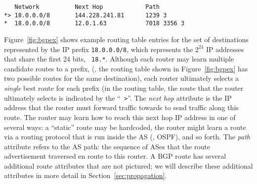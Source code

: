 \begin{figure*}[tb!]
\begin{center}
\begin{small}
\begin{minipage}{5in}
\begin{verbatim}
   Network          Next Hop            Path
*> 18.0.0.0/8       144.228.241.81      1239 3 
*  18.0.0.0/8       12.0.1.63           7018 3356 3 
\end{verbatim}
\end{minipage}
\end{small}
\end{center}
\caption[Example BGP routing table entry]{BGP routing table entry for
prefix 18.0.0.0/8 as 
  it might appear on a router.  Each BGP route has attributes in
  addition to the next hop IP address and AS path, which we will discuss
  later.}
\label{fig:bgpex}
\end{figure*}


Figure~\ref{fig:bgpex} shows example routing table entries for the set
of destinations represented by the IP prefix {\tt 18.0.0.0/8}, which
represents the $2^{24}$ IP addresses that share the first 24 bits, {\tt
18.*}.  Although each router may learn multiple candidate routes
to a prefix, (\ie, the routing table shown in Figure~\ref{fig:bgpex} has
two possible routes for the same destination), each router ultimately
selects a {\em single} best route for each prefix (in the routing table,
the route that the router ultimately selects is indicated by the ``{\tt
>}''.  The {\em next hop} attribute is the IP address that the router
must forward traffic towards to send traffic along this route.  The
router may learn how to reach this next hop IP address in one of several
ways: a ``static'' route may be hardcoded, the router might learn a
route via a routing protocol that is run inside the AS (\eg, OSPF),
and so forth.  The {\em path} attribute refers to the AS path: the
sequence of ASes that the route advertisement traversed en route to this
router.  
A BGP route has several additional route attributes that are not
pictured; we will describe
these additional attributes in more detail in Section~\ref{sec:propagation}.

